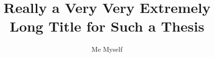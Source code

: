 \documentclass[english,diss]{LEAthesis}
\title{Really a Very Very Extremely Long Title for Such a Thesis}
\author{Me Myself}
\begin{document}
\maketitle              

\frontmatter
    \makedeclaration
    
    \tableofcontents
    
\mainmatter

    
    
    
    

\backmatter
    
    
    \lists

    \ifdiss\iffinal\else\fi\fi
\end{document}

